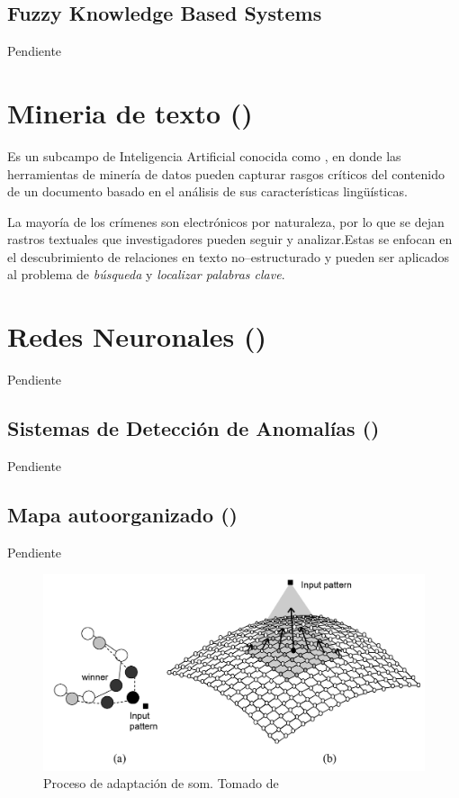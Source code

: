 \subsection{Fuzzy Knowledge Based Systems}
Pendiente


\section{Mineria de texto ()} \label{secNLP}
Es un subcampo de Inteligencia Artificial conocida como , en donde las herramientas de minería de datos pueden capturar rasgos críticos del contenido de un documento basado en el análisis de sus características lingüísticas.

La mayoría de los crímenes son electrónicos por naturaleza, por lo que se dejan rastros textuales que investigadores pueden seguir y analizar.Estas se enfocan en el descubrimiento de relaciones en texto no--estructurado y pueden ser aplicados al problema de \emph{búsqueda} y \emph{localizar palabras clave}.


\section{Redes Neuronales ()} \label{secNN}
Pendiente

\subsection{Sistemas de Detección de Anomalías ()}
Pendiente

\subsection{Mapa autoorganizado ()}
Pendiente
\begin{figure}[th]
\centering
\includegraphics[scale=0.2]{Figures/som-adaptive-proc.png}
\decoRule
\caption[Proceso de adaptación de \gls{som}]{Proceso de adaptación de \gls{som}. Tomado de \cite{de2006fundamentals}}
\label{fig:som-adap-proc}
\end{figure}

